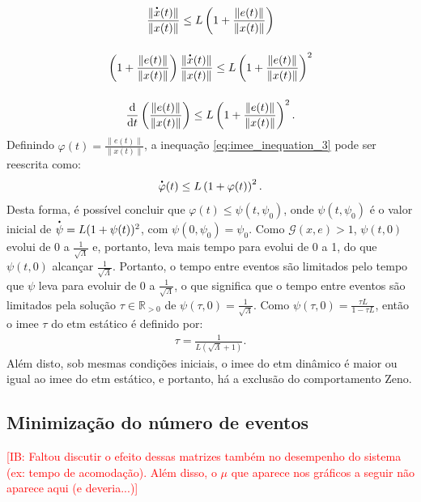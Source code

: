 \begin{gather}
  \frac{\|\dt{x}(t)\|}{\|x(t)\|} \leq L\left(1 + \frac{\|e(t)\|}{\|x(t)\|}\right) \notag \\[12pt]
  \left( 1 + \frac{\|e(t)\|}{\|x(t)\|} \right) \frac{\|\dt{x}(t)\|}{\|x(t)\|} \leq L\left( 1 + \frac{\|e(t)\|}{\|x(t)\|} \right) ^ 2 \notag \\[12pt]
  \frac{\mathrm{d}}{\mathrm{d}t}\left(\frac{\|e(t)\|}{\|x(t)\|}\right) \leq L\left( 1 + \frac{\|e(t)\|}{\|x(t)\|} \right) ^ 2.
  \label{eq:imee_inequation_3}
\end{gather} Definindo $\varphi (t) = \displaystyle \frac{\|e(t)\|}{\|x(t)\|}$, a inequação \eqref{eq:imee_inequation_3} pode ser reescrita como: \begin{equation}
  \dt{\varphi}(t) \leq L \left(1 + \varphi(t)\right)^2.
\end{equation} Desta forma, é possível concluir que $\varphi(t) \leq \psi(t, \psi_0)$, onde $\psi(t, \psi_0)$ é o valor inicial de $\dt{\psi} = L(1 + \psi(t))^2$, com $\psi(0, \psi_0) = \psi_0$. Como $\mathcal{G}(x, e) > 1$, $\psi(t, 0)$ evolui de 0 a $\frac{1}{\sqrt{\Lambda}}$ e, portanto, leva mais tempo para evolui de 0 a 1, do que $\psi(t, 0)$ alcançar $\frac{1}{\sqrt{\Lambda}}$. Portanto, o tempo entre eventos são limitados pelo tempo que $\psi$ leva para evoluir de 0 a $\frac{1}{\sqrt{\Lambda}}$, o que significa que o tempo entre eventos são limitados pela solução $\tau \in \mathbb{R}_{>0}$ de $\psi(\tau, 0) = \frac{1}{\sqrt{\Lambda}}$. Como $\psi(\tau, 0) = \frac{\tau L}{1 - \tau L}$, então o \acrshort{imee} $\tau$ do \acrshort{etm} estático é definido por: \begin{gather}
  \tau = \frac{1}{L(\sqrt{\Lambda} + 1)}.
  \label{eq:imee_final_inequation}
\end{gather} Além disto, sob mesmas condições iniciais, o \acrshort{imee} do \acrshort{etm} dinâmico é maior ou igual ao \acrshort{imee} do \acrshort{etm} estático, e portanto, há a exclusão do comportamento Zeno.

\subsection{Minimização do número de eventos}

\textcolor{red}{[IB: Faltou discutir o efeito dessas matrizes também no desempenho do sistema (ex: tempo de acomodação). Além disso, o $\mu$ que aparece nos gráficos a seguir não aparece aqui (e deveria...)]}

